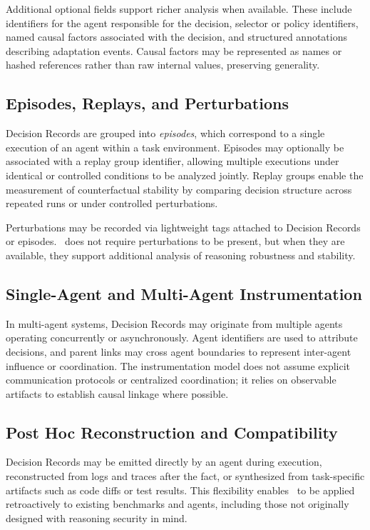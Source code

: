 Additional optional fields support richer analysis when available. These include identifiers for the agent responsible for the decision, selector or policy identifiers, named causal factors associated with the decision, and structured annotations describing adaptation events. Causal factors may be represented as names or hashed references rather than raw internal values, preserving generality.

\subsection{Episodes, Replays, and Perturbations}
Decision Records are grouped into \emph{episodes}, which correspond to a single execution of an agent within a task environment. Episodes may optionally be associated with a replay group identifier, allowing multiple executions under identical or controlled conditions to be analyzed jointly. Replay groups enable the measurement of counterfactual stability by comparing decision structure across repeated runs or under controlled perturbations.

Perturbations may be recorded via lightweight tags attached to Decision Records or episodes. \RSS\ does not require perturbations to be present, but when they are available, they support additional analysis of reasoning robustness and stability.

\subsection{Single-Agent and Multi-Agent Instrumentation}
In multi-agent systems, Decision Records may originate from multiple agents operating concurrently or asynchronously. Agent identifiers are used to attribute decisions, and parent links may cross agent boundaries to represent inter-agent influence or coordination. The instrumentation model does not assume explicit communication protocols or centralized coordination; it relies on observable artifacts to establish causal linkage where possible.

\subsection{Post Hoc Reconstruction and Compatibility}
Decision Records may be emitted directly by an agent during execution, reconstructed from logs and traces after the fact, or synthesized from task-specific artifacts such as code diffs or test results. This flexibility enables \RSS\ to be applied retroactively to existing benchmarks and agents, including those not originally designed with reasoning security in mind.
